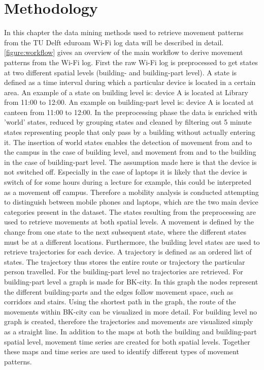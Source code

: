 \chapter{Methodology}\label{Methodology}
In this chapter the data mining methods used to retrieve movement patterns from the TU Delft eduroam Wi-Fi log data will be described in detail. \autoref{figure:workflow} gives an overview of the main workflow to derive movement patterns from the Wi-Fi log. First the raw Wi-Fi log is preprocessed to get states at two different spatial levels (building- and building-part level). A state is defined as a time interval during which a particular device is located in a certain area. An example of a state on building level is: device A is located at Library from 11:00 to 12:00. An example on building-part level is: device A is located at canteen from 11:00 to 12:00. In the preprocessing phase the data is enriched with 'world' states, reduced by grouping states and cleaned by filtering out 5 minute states representing people that only pass by a building without actually entering it. The insertion of world states enables the detection of movement from and to the campus in the case of building level, and movement from and to the building in the case of building-part level. The assumption made here is that the device is not switched off. Especially in the case of laptops it is likely that the device is switch of for some hours during a lecture for example, this could be interpreted as a movement off campus. Therefore a mobility analysis is conducted attempting to distinguish between mobile phones and laptops, which are the two main device categories present in the dataset. The states resulting from the preprocessing are used to retrieve movements at both spatial levels. A movement is defined by the change from one state to the next subsequent state, where the different states must be at a different locations. Furthermore, the building level states are used to retrieve trajectories for each device. A trajectory is defined as an ordered list of states. The trajectory thus stores the entire route or trajectory the particular person travelled. For the building-part level no trajectories are retrieved. For building-part level a graph is made for BK-city. In this graph the nodes represent the different building-parts and the edges follow movement space, such as corridors and stairs. Using the shortest path in the graph, the route of the movements within BK-city can be visualized in more detail. For building level no graph is created, therefore the trajectories and movements are visualized simply as a straight line. In addition to the maps at both the building and building-part spatial level, movement time series are created for both spatial levels. Together these maps and time series are used to identify different types of movement patterns.

